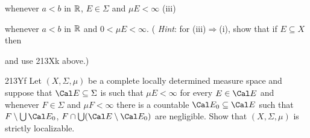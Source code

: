 {

\noindent whenever $a<b$ in $\Bbb R$, $E\in\Sigma$ and $\mu E<\infty$ (iii)


\noindent  whenever $a<b$ in $\Bbb R$ and $0<\mu E<\infty$.  ({\it
Hint\/}:
for (iii)$\Rightarrow$(i), show that if $E\subseteq X$ then


\noindent and use 213Xk above.)

\spheader 213Yf Let $(X,\Sigma,\mu)$ be a complete locally determined
measure space and suppose that $\Cal E\subseteq\Sigma$ is such that
$\mu E<\infty$ for every $E\in\Cal E$ and whenever $F\in\Sigma$ and
$\mu F<\infty$ there is a countable $\Cal E_0\subseteq\Cal E$ such that
$F\setminus\bigcup\Cal E_0$, $F\cap\bigcup(\Cal E\setminus\Cal E_0)$ are
negligible.   Show that $(X,\Sigma,\mu)$ is strictly localizable.
}%

